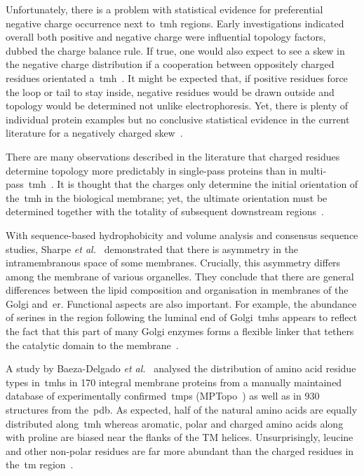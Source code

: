 Unfortunately, there is a problem with statistical evidence for preferential negative charge occurrence next to~\gls{tmh} regions.
Early investigations indicated overall both positive and negative charge were influential topology factors, dubbed the charge balance rule.
If true, one would also expect to see a skew in the negative charge distribution if a cooperation between oppositely charged residues orientated a~\gls{tmh}~\cite{Sipos1993, Hartmann1989}.
It might be expected that, if positive residues force the loop or tail to stay inside, negative residues would be drawn outside and topology would be determined not unlike electrophoresis.
Yet, there is plenty of individual protein examples but no conclusive statistical evidence in the current literature for a negatively charged skew~\cite{Sharpe2010, Baeza-Delgado2013, Granseth2005, Pogozheva2013, Nilsson2005a, Andersson1992}.

There are many observations described in the literature that charged residues determine topology more predictably in single-pass proteins than in multi-pass~\gls{tmh}~\cite{Kim1994, Harley1998}.
It is thought that the charges only determine the initial orientation of the~\gls{tmh} in the biological membrane; yet, the ultimate orientation must be determined together with the totality of subsequent downstream regions~\cite{Sato1998}.

With sequence-based hydrophobicity and volume analysis and consensus sequence studies, Sharpe \textit{et al.}~\cite{Sharpe2010} demonstrated that there is asymmetry in the intramembranous space of some membranes.
Crucially, this asymmetry differs among the membrane of various organelles.
They conclude that there are general differences between the lipid composition and organisation in membranes of the Golgi and~\gls{er}.
Functional aspects are also important.
For example, the abundance of serines in the region following the luminal end of Golgi~\gls{tmh}s appears to reflect the fact that this part of many Golgi enzymes forms a flexible linker that tethers the catalytic domain to the membrane~\cite{Sharpe2010}.

A study by Baeza-Delgado \textit{et al.}~\cite{Baeza-Delgado2013} analysed the distribution of amino acid residue types in~\gls{tmh}s in 170 integral membrane proteins from a manually maintained database of experimentally confirmed~\gls{tmp}s (MPTopo~\cite{Jayasinghe2001}) as well as in 930 structures from the~\gls{pdb}.
As expected, half of the natural amino acids are equally distributed along~\gls{tmh} whereas aromatic, polar and charged amino acids along with proline are biased near the flanks of the TM helices.
Unsurprisingly, leucine and other non-polar residues are far more abundant than the charged residues in the~\gls{tm} region~\cite{Sharpe2010}.

